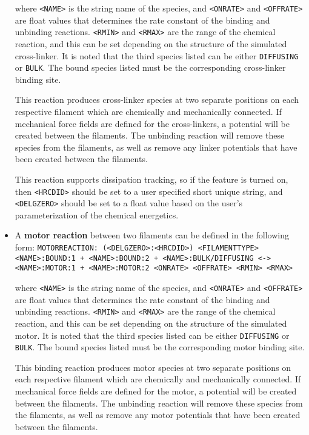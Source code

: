 \documentclass[11pt, oneside]{article}   	%
\begin{document}
\begin{itemize}
	where \texttt{<NAME>} is the string name of the species, and \texttt{<ONRATE>} and \texttt{<OFFRATE>} are float values that determines the rate constant of the binding and unbinding reactions. \texttt{<RMIN>} and \texttt{<RMAX>} are the range of the chemical reaction, and this can be set depending on the structure of the simulated cross-linker. It is noted that the third species listed can be either \texttt{DIFFUSING} or \texttt{BULK}. The bound species listed must be the corresponding cross-linker binding site.
	
	This reaction produces cross-linker species at two separate positions on each respective filament which are chemically and mechanically connected. If mechanical force fields are defined for the cross-linkers, a potential will be created between the filaments. The unbinding reaction will remove these species from the filaments, as well as remove any linker potentials that have been created between the filaments.
	
	This reaction supports dissipation tracking, so if the feature is turned on, then \texttt{<HRCDID>} should be set to a user specified short unique string, and \texttt{<DELGZERO>} should be set to a float value based on the user's parameterization of the chemical energetics.
	
	\item A \textbf{motor reaction} between two filaments can be defined in the following form:\newline\newline
	\texttt{MOTORREACTION: (<DELGZERO>:<HRCDID>) <FILAMENTTYPE>}\newline
	\texttt{<NAME>:BOUND:1 + <NAME>:BOUND:2 + <NAME>:BULK/DIFFUSING <->}\newline
	\texttt{<NAME>:MOTOR:1 + <NAME>:MOTOR:2 <ONRATE> <OFFRATE> <RMIN> <RMAX>}\newline
	
	where \texttt{<NAME>} is the string name of the species, and \texttt{<ONRATE>} and \texttt{<OFFRATE>} are float values that determines the rate constant of the binding and unbinding reactions. \texttt{<RMIN>} and \texttt{<RMAX>} are the range of the chemical reaction, and this can be set depending on the structure of the simulated motor. It is noted that the third species listed can be either \texttt{DIFFUSING} or \texttt{BULK}. The bound species listed must be the corresponding motor binding site.
	
	This binding reaction produces motor species at two separate positions on each respective filament which are chemically and mechanically connected. If mechanical force fields are defined for the motor, a potential will be created between the filaments. The unbinding reaction will remove these species from the filaments, as well as remove any motor potentials that have been created between the filaments.
	

\end{itemize}
\end{document}
